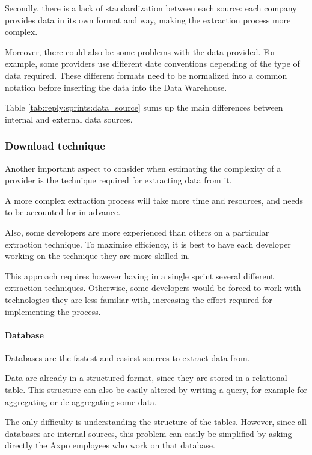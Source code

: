         Secondly, there is a lack of standardization between each source: each company provides data in its own format and way, making the extraction process more complex.
        
        Moreover, there could also be some problems with the data provided.
        For example, some providers use different date conventions depending of the type of data required.
        These different formats need to be normalized into a common notation before inserting the data into the Data Warehouse.\newline
        
    Table \ref{tab:reply:sprints:data_source} sums up the main differences between internal and external data sources.
        
\subsubsection{Download technique}
    Another important aspect to consider when estimating the complexity of a provider is the technique required for extracting data from it.
    
    A more complex extraction process will take more time and resources, and needs to be accounted for in advance.
    
    Also, some developers are more experienced than others on a particular extraction technique.
    To maximise efficiency, it is best to have each developer working on the technique they are more skilled in.
    
    This approach requires however having in a single sprint several different extraction techniques.
    Otherwise, some developers would be forced to work with technologies they are less familiar with, increasing the effort required for implementing the process.
    
    \paragraph{Database}
        Databases are the fastest and easiest sources to extract data from.
        
        Data are already in a structured format, since they are stored in a relational table.
        This structure can also be easily altered by writing a query, for example for aggregating or de-aggregating some data.
        
        The only difficulty is understanding the structure of the tables.
        However, since all databases are internal sources, this problem can easily be simplified by asking directly the Axpo employees who work on that database.
    
